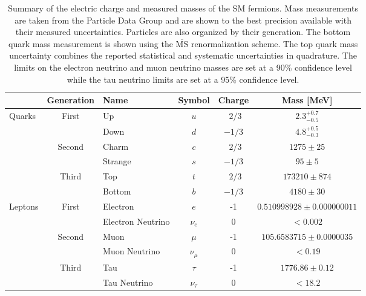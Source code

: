 \begin{table}[ht]
\centering
\small
\begin{tabular}{|lclc|c|c|}
\hline
                        & Generation & Name & Symbol  & Charge & Mass [MeV]\\
\hline
\hline
\multirow{6}{*}{Quarks}& \multirow{2}{*}{First}& Up & $u$   &  $~~2/3$    &  $2.3 ^{+0.7}_{-0.5}$    \\
                       & & Down & $d$  &  $-1/3$    &  $4.8^{+0.5}_{-0.3}$    \\
		       \cline{2-6} 
                       &\multirow{2}{*}{Second}& Charm & $c$   & $~~2/3$     & $1275 \pm 25$     \\
                       && Strange & $s$   & $-1/3$     & $95 \pm 5$     \\
		       \cline{2-6} 
                       &\multirow{2}{*}{Third}& Top & $t$   &  $~~2/3$    &  $173210 \pm 874$    \\
                       && Bottom & $b$   &  $-1/3$    & $4180 \pm 30$     \\
\hline
\hline
\multirow{6}{*}{Leptons}&\multirow{2}{*}{First} &Electron & $e$     &  -1    &  $0.510998928 \pm 0.000000011 $ \\
                        & & Electron Neutrino & $\nu_e$  & 0    &   $ < 0.002$    \\
		       \cline{2-6} 
                        &\multirow{2}{*}{Second} &Muon & $\mu$     &   -1   &   $105.6583715 \pm 0.0000035$   \\
                        & &Muon Neutrino & $\nu_{\mu}$  & 0   &  $ < 0.19$    \\
		       \cline{2-6} 
                        & \multirow{2}{*}{Third}&Tau & $\tau$     &   -1   &  $1776.86 \pm 0.12$    \\
                        & &Tau Neutrino & $\nu_{\tau}$  & 0    &  $< 18.2 $    \\
\hline
\end{tabular}
\label{tab:theory_fermions}
\caption{Summary of the electric charge and measured masses of the SM fermions. Mass measurements
are taken from the Particle Data Group \cite{PDG:2014} and 
are shown to the best precision available with their measured uncertainties.
Particles are also organized by their generation.
The bottom quark mass measurement is shown using the $\overline{\textrm{MS}}$ 
renormalization scheme.
The top quark mass uncertainty combines the reported statistical and 
systematic uncertainties 
in quadrature.
The limits on the electron neutrino and muon neutrino masses are 
set at a 90\% confidence level 
while the tau neutrino limits are set at a 95\% confidence level.}
\end{table}




